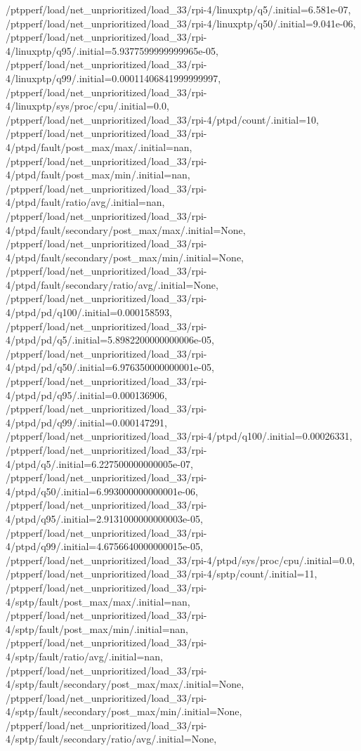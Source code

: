 {    /ptpperf/load/net_unprioritized/load_33/rpi-4/linuxptp/q5/.initial=6.581e-07,
    /ptpperf/load/net_unprioritized/load_33/rpi-4/linuxptp/q50/.initial=9.041e-06,
    /ptpperf/load/net_unprioritized/load_33/rpi-4/linuxptp/q95/.initial=5.9377599999999965e-05,
    /ptpperf/load/net_unprioritized/load_33/rpi-4/linuxptp/q99/.initial=0.00011406841999999997,
    /ptpperf/load/net_unprioritized/load_33/rpi-4/linuxptp/sys/proc/cpu/.initial=0.0,
    /ptpperf/load/net_unprioritized/load_33/rpi-4/ptpd/count/.initial=10,
    /ptpperf/load/net_unprioritized/load_33/rpi-4/ptpd/fault/post_max/max/.initial=nan,
    /ptpperf/load/net_unprioritized/load_33/rpi-4/ptpd/fault/post_max/min/.initial=nan,
    /ptpperf/load/net_unprioritized/load_33/rpi-4/ptpd/fault/ratio/avg/.initial=nan,
    /ptpperf/load/net_unprioritized/load_33/rpi-4/ptpd/fault/secondary/post_max/max/.initial=None,
    /ptpperf/load/net_unprioritized/load_33/rpi-4/ptpd/fault/secondary/post_max/min/.initial=None,
    /ptpperf/load/net_unprioritized/load_33/rpi-4/ptpd/fault/secondary/ratio/avg/.initial=None,
    /ptpperf/load/net_unprioritized/load_33/rpi-4/ptpd/pd/q100/.initial=0.000158593,
    /ptpperf/load/net_unprioritized/load_33/rpi-4/ptpd/pd/q5/.initial=5.8982200000000006e-05,
    /ptpperf/load/net_unprioritized/load_33/rpi-4/ptpd/pd/q50/.initial=6.976350000000001e-05,
    /ptpperf/load/net_unprioritized/load_33/rpi-4/ptpd/pd/q95/.initial=0.000136906,
    /ptpperf/load/net_unprioritized/load_33/rpi-4/ptpd/pd/q99/.initial=0.000147291,
    /ptpperf/load/net_unprioritized/load_33/rpi-4/ptpd/q100/.initial=0.00026331,
    /ptpperf/load/net_unprioritized/load_33/rpi-4/ptpd/q5/.initial=6.227500000000005e-07,
    /ptpperf/load/net_unprioritized/load_33/rpi-4/ptpd/q50/.initial=6.993000000000001e-06,
    /ptpperf/load/net_unprioritized/load_33/rpi-4/ptpd/q95/.initial=2.9131000000000003e-05,
    /ptpperf/load/net_unprioritized/load_33/rpi-4/ptpd/q99/.initial=4.6756640000000015e-05,
    /ptpperf/load/net_unprioritized/load_33/rpi-4/ptpd/sys/proc/cpu/.initial=0.0,
    /ptpperf/load/net_unprioritized/load_33/rpi-4/sptp/count/.initial=11,
    /ptpperf/load/net_unprioritized/load_33/rpi-4/sptp/fault/post_max/max/.initial=nan,
    /ptpperf/load/net_unprioritized/load_33/rpi-4/sptp/fault/post_max/min/.initial=nan,
    /ptpperf/load/net_unprioritized/load_33/rpi-4/sptp/fault/ratio/avg/.initial=nan,
    /ptpperf/load/net_unprioritized/load_33/rpi-4/sptp/fault/secondary/post_max/max/.initial=None,
    /ptpperf/load/net_unprioritized/load_33/rpi-4/sptp/fault/secondary/post_max/min/.initial=None,
    /ptpperf/load/net_unprioritized/load_33/rpi-4/sptp/fault/secondary/ratio/avg/.initial=None,
}
